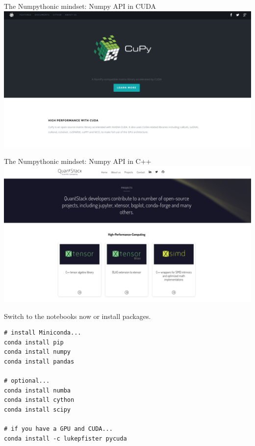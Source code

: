 \documentclass[aspectratio=169]{beamer}
\begin{document}
\begin{frame}{The Numpythonic mindset: Numpy API in CUDA}
\vspace{0.35 cm}
\includegraphics[width=\linewidth]{cupy.png}
\end{frame}

\begin{frame}{The Numpythonic mindset: Numpy API in C++}
\vspace{0.35 cm}
\includegraphics[width=\linewidth]{quantstack.png}
\end{frame}

\begin{frame}[fragile]{}
\huge
\vspace{0.75 cm}
\begin{center}
Switch to the notebooks now or install packages.

\large
\vspace{0.5 cm}
\begin{minipage}{0.6\linewidth}
\begin{verbatim}
# install Miniconda...
conda install pip
conda install numpy
conda install pandas

# optional...
conda install numba
conda install cython
conda install scipy

# if you have a GPU and CUDA...
conda install -c lukepfister pycuda
\end{verbatim}
\end{minipage}
\end{center}
\end{frame}
\end{document}
